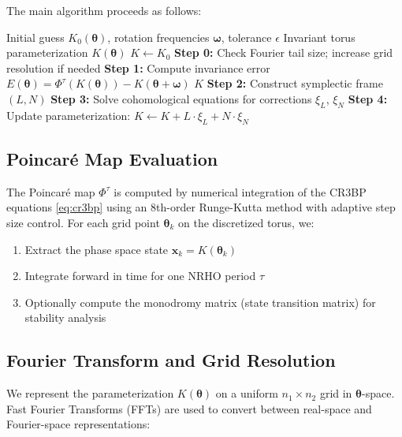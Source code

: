 \documentclass[review,onefignum,onetabnum]{siamart220329}
\newcommand{\norm}[1]{\left\|#1\right\|}
\begin{document}
The main algorithm proceeds as follows:

\begin{algorithm}
\caption{KAM Torus Computation via Parameterization Method}
\label{alg:kam_torus}
\begin{algorithmic}[1]
\REQUIRE Initial guess $K_0(\boldsymbol{\theta})$, rotation frequencies
         $\boldsymbol{\omega}$, tolerance $\epsilon$
\ENSURE Invariant torus parameterization $K(\boldsymbol{\theta})$
\STATE $K \gets K_0$
\WHILE{$\norm{E} > \epsilon$}
    \STATE \textbf{Step 0:} Check Fourier tail size; increase grid resolution if needed
    \STATE \textbf{Step 1:} Compute invariance error $E(\boldsymbol{\theta}) =
           \Phi^\tau(K(\boldsymbol{\theta})) - K(\boldsymbol{\theta} + \boldsymbol{\omega})$
    \IF{$\norm{E} < \epsilon$}
        \RETURN $K$
    \ENDIF
    \STATE \textbf{Step 2:} Construct symplectic frame $(L, N)$
    \STATE \textbf{Step 3:} Solve cohomological equations for corrections
           $\xi_L$, $\xi_N$
    \STATE \textbf{Step 4:} Update parameterization:
           $K \gets K + L \cdot \xi_L + N \cdot \xi_N$
\ENDWHILE
\end{algorithmic}
\end{algorithm}

\subsection{Poincaré Map Evaluation}

The Poincaré map $\Phi^\tau$ is computed by numerical integration of the CR3BP
equations \eqref{eq:cr3bp} using an 8th-order Runge-Kutta method with adaptive
step size control. For each grid point $\boldsymbol{\theta}_k$ on the discretized
torus, we:

\begin{enumerate}
    \item Extract the phase space state $\mathbf{x}_k = K(\boldsymbol{\theta}_k)$
    \item Integrate forward in time for one NRHO period $\tau$
    \item Optionally compute the monodromy matrix (state transition matrix) for
          stability analysis
\end{enumerate}

\subsection{Fourier Transform and Grid Resolution}

We represent the parameterization $K(\boldsymbol{\theta})$ on a uniform
$n_1 \times n_2$ grid in $\boldsymbol{\theta}$-space. Fast Fourier Transforms
(FFTs) are used to convert between real-space and Fourier-space representations:
\end{document}
